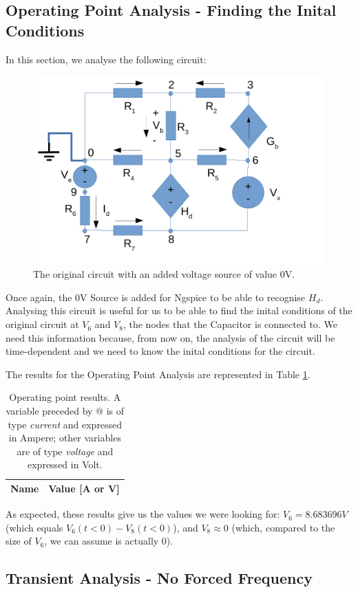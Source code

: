 \subsection{Operating Point Analysis - Finding the Inital Conditions}

In this section, we analyse the following circuit:

\begin{figure}[h] \centering
\includegraphics[width=0.5\linewidth]{t2-sim2.pdf}
\caption{The original circuit with an added voltage source of value 0V.}
\label{fig:sim2}
\end{figure}

Once again, the 0V Source is added for Ngspice to be able to recognise $H_d$.
Analysing this circuit is useful for us to be able to find the inital conditions of the original circuit at $V_6$ and $V_8$, the nodes that the Capacitor is connected to. We need this information because, from now on, the analysis of the circuit will be time-dependent and we need to know the inital conditions for the circuit.

The results for the Operating Point Analysis are represented in Table \ref{tab:sim2}.

\begin{table}[htb!]
  \centering
  \begin{tabular}{|l|r|}
    \hline    
    {\bf Name} & {\bf Value [A or V]} \\ \hline
    
  \end{tabular}
  \caption{Operating point results. A variable preceded by @ is of type {\em current}
    and expressed in Ampere; other variables are of type {\it voltage} and expressed in
    Volt.}
  \label{tab:sim2}
\end{table}

As expected, these results give us the values we were looking for: $V_6 = 8.683696V$ (which equals $V_6(t < 0) - V_8(t < 0)$), and $V_8 \approx 0$ (which, compared to the size of $V_6$, we can assume is actually 0).

\subsection{Transient Analysis - No Forced Frequency}

